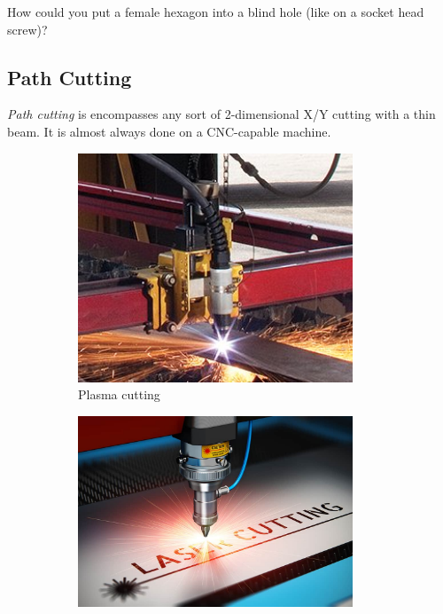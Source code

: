 \addvspace{2.0ex}
 \begin{qbox}
 	How could you put a female hexagon into a blind hole (like on a socket head screw)?
 \end{qbox}
 
 
 \subsection{Path Cutting}
 
 \textit{Path cutting} is encompasses any sort of 2-dimensional X/Y cutting with a thin beam. It is almost always done on a CNC-capable machine.
 
 \begin{figure}[H]
		\begin{subfigure}[b]{.24\linewidth}
			\includegraphics[width=0.9\textwidth]{imgs/plasmacut.jpeg}
			\caption{Plasma cutting}
		\end{subfigure}\begin{subfigure}[b]{.24\linewidth}
			\includegraphics[width=0.9\textwidth]{imgs/lasercut.jpeg}

\end{subfigure}
\end{figure}
